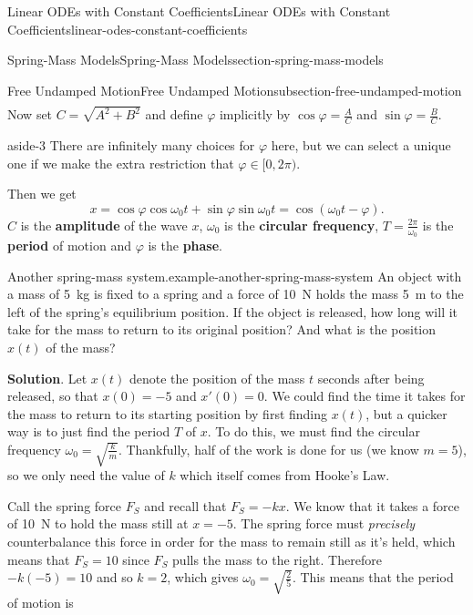 \documentclass[oneside,10pt,]{book}
\newcommand{\terminology}[1]{\textbf{#1}}
\numberwithin{equation}{section}
\begin{document}
\begin{chapterptx}{Linear ODEs with Constant Coefficients}{}{Linear ODEs with Constant Coefficients}{}{}{linear-odes-constant-coefficients}
\begin{sectionptx}{Spring-Mass Models}{}{Spring-Mass Models}{}{}{section-spring-mass-models}
\begin{subsectionptx}{Free Undamped Motion}{}{Free Undamped Motion}{}{}{subsection-free-undamped-motion}
\begin{align*}
\end{align*}
Now set \(C = \sqrt{A^{2} + B^{2}}\) and define \(\varphi\) implicitly by \(\cos\varphi = \frac{A}{C}\) and \(\sin\varphi = \frac{B}{C}\). \begin{aside}{}{aside-3}%
\hypertarget{p-203}{}%
There are infinitely many choices for \(\varphi\) here, but we can select a unique one if we make the extra restriction that \(\varphi\in[0,2\pi)\).%
\end{aside}
 Then we get%
\begin{equation*}
x = \cos\varphi\cos\omega_{0}t + \sin\varphi\sin\omega_{0}t = \cos(\omega_{0}t - \varphi).
\end{equation*}
\(C\) is the \terminology{amplitude} of the wave \(x\), \(\omega_{0}\) is the \terminology{circular frequency}, \(T = \frac{2\pi}{\omega_{0}}\) is the \terminology{period} of motion and \(\varphi\) is the \terminology{phase}.%
\begin{example}{Another spring-mass system.}{example-another-spring-mass-system}%
\hypertarget{p-204}{}%
An object with a mass of \SI{5}{\kilo\gram} is fixed to a spring and a force of \SI{10}{\newton} holds the mass \SI{5}{\meter} to the left of the spring's equilibrium position. If the object is released, how long will it take for the mass to return to its original position? And what is the position \(x(t)\) of the mass?%
\par\smallskip%
\noindent\textbf{Solution}.\hypertarget{solution-30}{}\quad%
\hypertarget{p-205}{}%
Let \(x(t)\) denote the position of the mass \(t\) seconds after being released, so that \(x(0) = -5\) and \(x'(0) = 0\). We could find the time it takes for the mass to return to its starting position by first finding \(x(t)\), but a quicker way is to just find the period \(T\) of \(x\). To do this, we must find the circular frequency \(\omega_{0} = \sqrt{\frac{k}{m}}\). Thankfully, half of the work is done for us (we know \(m=5\)), so we only need the value of \(k\) which itself comes from Hooke's Law.%
\par
\hypertarget{p-206}{}%
Call the spring force \(F_{S}\) and recall that \(F_{S} = -kx\). We know that it takes a force of \SI{10}{\newton} to hold the mass still at \(x=-5\). The spring force must \emph{precisely} counterbalance this force in order for the mass to remain still as it's held, which means that \(F_{S} = 10\) since \(F_{S}\) pulls the mass to the right. Therefore \(-k(-5) = 10\) and so \(k=2\), which gives \(\omega_{0} = \sqrt{\frac{2}{5}}\). This means that the period of motion is%
\begin{equation*}

\end{equation*}
\end{example}
\end{subsectionptx}
\end{sectionptx}
\end{chapterptx}
\end{document}
